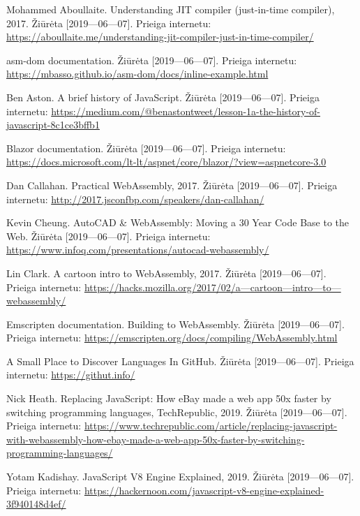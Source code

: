 \documentclass{VUMIFPSkursinis}
\begin{document}
\begin{thebibliography}{99}

Mohammed Aboullaite. Understanding JIT compiler (just-in-time compiler), 2017. Žiūrėta [2019—06—07]. Prieiga internetu: \url{https://aboullaite.me/understanding-jit-compiler-just-in-time-compiler/}

asm-dom documentation. Žiūrėta [2019—06—07]. Prieiga internetu: \url{https://mbasso.github.io/asm-dom/docs/inline-example.html}

Ben Aston. A brief history of JavaScript. Žiūrėta [2019—06—07]. Prieiga internetu: \url{https://medium.com/@benastontweet/lesson-1a-the-history-of-javascript-8c1ce3bffb1}

Blazor documentation. Žiūrėta [2019—06—07]. Prieiga internetu: \url{https://docs.microsoft.com/lt-lt/aspnet/core/blazor/?view=aspnetcore-3.0}

Dan Callahan. Practical WebAssembly, 2017. Žiūrėta [2019—06—07]. Prieiga internetu: \url{http://2017.jsconfbp.com/speakers/dan-callahan/}

Kevin Cheung. AutoCAD \& WebAssembly: Moving a 30 Year Code Base to the Web. Žiūrėta [2019—06—07]. Prieiga internetu: \url{https://www.infoq.com/presentations/autocad-webassembly/}

Lin Clark. A cartoon intro to WebAssembly, 2017. Žiūrėta [2019—06—07]. Prieiga internetu: \url{https://hacks.mozilla.org/2017/02/a—cartoon—intro—to—webassembly/}

Emscripten documentation. Building to WebAssembly. Žiūrėta [2019—06—07]. Prieiga internetu: \url{https://emscripten.org/docs/compiling/WebAssembly.html}

A Small Place to Discover Languages In GitHub. Žiūrėta [2019—06—07]. Prieiga internetu: \url{https://githut.info/}

Nick Heath. Replacing JavaScript: How eBay made a web app 50x faster by switching programming languages, TechRepublic, 2019. Žiūrėta [2019—06—07]. Prieiga internetu:
\url{https://www.techrepublic.com/article/replacing-javascript-with-webassembly-how-ebay-made-a-web-app-50x-faster-by-switching-programming-languages/}

Yotam Kadishay. JavaScript V8 Engine Explained, 2019. Žiūrėta [2019—06—07]. Prieiga internetu: \url{https://hackernoon.com/javascript-v8-engine-explained-3f940148d4ef/}


\end{thebibliography}
\end{document}
